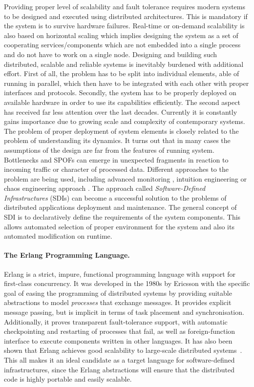 \documentclass[a4paper,11pt]{article}
\begin{document}
Providing proper level of scalability and fault tolerance requires modern systems to be designed and executed using distributed architectures. This is mandatory if the system is to survive hardware failures. Real-time or on-demand scalability is also based on horizontal scaling which implies designing the system as a set of cooperating services/components which are not embedded into a single process and do not have to work on a single node. Designing and building such distributed, scalable and reliable systems is inevitably burdened with additional effort. First of all, the problem has to be split into individual elements, able of running in parallel, which then have to be integrated with each other with proper interfaces and protocols. Secondly, the system has to be properly deployed on available hardware in order to use its capabilities efficiently. The second aspect has received far less attention over the last decades. Currently it is constantly gains importance due to growing scale and complexity of contemporary systems. The problem of proper deployment of system elements is closely related to the problem of understanding its dynamics. It turns out that in many cases the assumptions of the design are far from the features of running system. Bottlenecks and SPOFs can emerge in unexpected fragments in reaction to incoming traffic or character of processed data. Different approaches to the problem are being used, including advanced monitoring \cite{ Akkoorath:2016}, intuition engineering \cite{vizceral} or chaos engineering approach \cite{basiri2016chaos}.
%
The approach called \emph{Software-Defined Infrastructures} (SDIs) can become a successful  solution to the problems of distributed applications deployment and maintenance. The general concept of SDI is to declaratively define the requirements of the system components. This allows automated selection of proper environment for the system and also its automated modification on runtime. 

\paragraph{The Erlang Programming Language.} Erlang is a strict, impure, functional programming language with support for first-class concurrency. It was developed in the 1980s by Ericsson with the specific goal of easing the programming of distributed systems by providing suitable abstractions to model \emph{processes} that exchange messages. It provides explicit message passing, but is implicit in terms of task placement and synchronisation. Additionally, it proves transparent fault-tolerance support, with automatic checkpointing and restarting of processes that fail, as well as foreign-function interface to execute components written in other languages. It has also been shown that Erlang achieves good scalability to large-scale distributed systems~\cite{release}. This all makes it an ideal candidate as a target language for software-defined infrastructures, since the Erlang abstractions will ensure that the distributed code is highly portable and easily scalable. 
\end{document}
